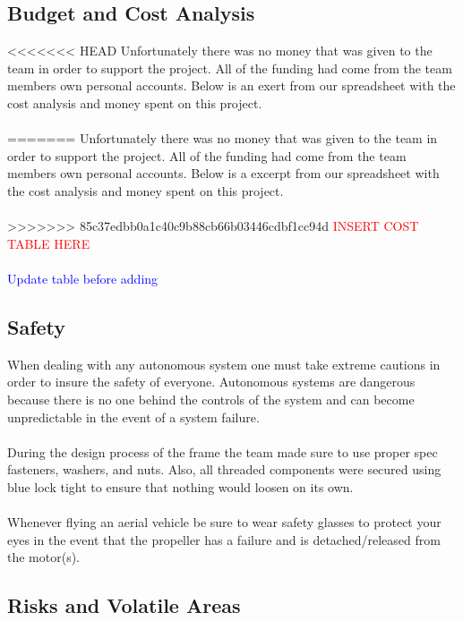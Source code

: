 \documentclass{article}
\numberwithin{equation}{section} %
\begin{document}
\subsection{Budget and Cost Analysis}
<<<<<<< HEAD
Unfortunately there was no money that was given to the team in order to support the project. All of the funding had come from the team members own personal accounts. Below is an exert from our spreadsheet with the cost analysis and money spent on this project.\\ \\
=======
Unfortunately there was no money that was given to the team in order to support the project. All of the funding had come from the team members own personal accounts. Below is a excerpt from our spreadsheet with the cost analysis and money spent on this project.\\ \\
>>>>>>> 85c37edbb0a1c40c9b88cb66b03446cdbf1cc94d
\textcolor{red}{INSERT COST TABLE HERE}\\ \\
\textcolor{blue}{Update table before adding}

\subsection{Safety}
When dealing with any autonomous system one must take extreme cautions in order to insure the safety of everyone. Autonomous systems are dangerous because there is no one behind the controls of the system and can become unpredictable in the event of a system failure. \\ \\ 
During the design process of the frame the team made sure to use proper spec fasteners, washers, and nuts. Also, all threaded components were secured using blue lock tight to ensure that nothing would loosen on its own. \\ \\
Whenever flying an aerial vehicle be sure to wear safety glasses to protect your eyes in the event that the propeller has a failure and is detached/released from the motor(s).

\subsection{Risks and Volatile Areas}
\end{document}
